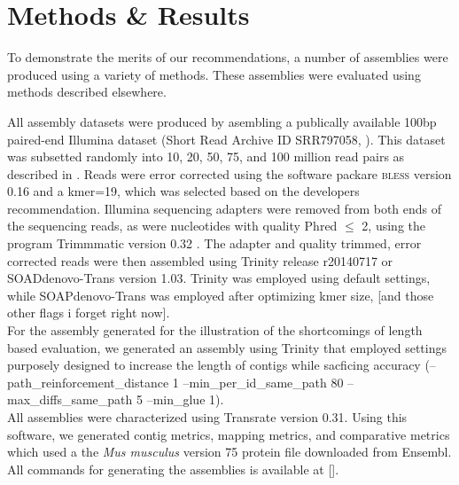 \section*{Methods & Results}

To demonstrate the merits of our recommendations, a number of assemblies were produced using a variety of methods. These assemblies were evaluated using methods described elsewhere. 

All assembly datasets were produced by asembling a publically available 100bp paired-end Illumina dataset (Short Read Archive ID SRR797058, \citep{Macfarlan:2012js}). This dataset was subsetted randomly into 10, 20, 50, 75, and 100 million read pairs as described in \citep{MacManes:2014io}. Reads were error corrected using the software packare \textsc{bless} version 0.16 \citep{Heo:2014cb} and a kmer=19, which was selected based on the developers recommendation.  Illumina sequencing adapters were removed from both ends of the sequencing reads, as were nucleotides with quality Phred $\leq$ 2, using the program Trimmmatic version 0.32 \citep{Bolger:2014ek}. The adapter and quality trimmed, error corrected reads were then assembled using Trinity release r20140717 or SOADdenovo-Trans version 1.03. Trinity was employed using default settings, while SOAPdenovo-Trans was employed after optimizing kmer size, [and those other flags i forget right now]. \\

For the assembly generated for the illustration of the shortcomings of length based evaluation, we generated an assembly using Trinity that employed settings purposely designed to increase the length of contigs while sacficing accuracy (--path\_reinforcement\_distance 1 --min\_per\_id\_same\_path 80  --max\_diffs\_same\_path 5 --min\_glue 1). \\

All assemblies were characterized using Transrate version 0.31. Using this software, we generated contig metrics, mapping metrics, and comparative metrics which used a the \textit{Mus musculus} version 75 protein file downloaded from Ensembl. All commands for generating the assemblies is available at [].  
